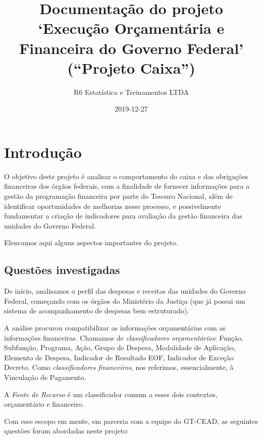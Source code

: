 \documentclass[]{book}
\title{Documentação do projeto `Execução Orçamentária e Financeira do Governo Federal' (``Projeto Caixa'')}
\author{R6 Estatística e Treinamentos LTDA}
\date{2019-12-27}
\begin{document}
\maketitle

{
\setcounter{tocdepth}{1}
\tableofcontents
}
\hypertarget{introduuxe7uxe3o}{%
\chapter{Introdução}\label{introduuxe7uxe3o}}

O objetivo deste projeto é analisar o comportamento do caixa e das obrigações financeiras dos órgãos federais, com a finalidade de fornecer informações para a gestão da programação financeira por parte do Tesouro Nacional, além de identificar oportunidades de melhorias nesse processo, e possivelmente fundamentar a criação de indicadores para avaliação da gestão financeira das unidades do Governo Federal.

Elencamos aqui alguns aspectos importantes do projeto.

\hypertarget{questuxf5es-investigadas}{%
\section{Questões investigadas}\label{questuxf5es-investigadas}}

De início, analisamos o perfil das despesas e receitas das unidades do Governo Federal, começando com os órgãos do Ministério da Justiça (que já possui um sistema de acompanhamento de despesas bem estruturado).

A análise procurou compatibilizar as informações orçamentárias com as informações financeiras. Chamamos de \emph{classificadores orçamentários}: Função, Subfunção, Programa, Ação, Grupo de Despesa, Modalidade de Aplicação, Elemento de Despesa, Indicador de Resultado EOF, Indicador de Exceção Decreto. Como \emph{classificadores financeiros}, nos referimos, essencialmente, à Vinculação de Pagamento.

A \emph{Fonte de Recurso} é um classificador comum a esses dois contextos, orçamentário e financeiro.

Com esse escopo em mente, em parceria com a equipe do GT-CEAD, as seguintes questões foram abordadas neste projeto:
\end{document}
